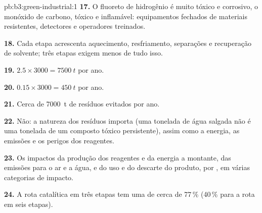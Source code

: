 \begin{solution}{pb:b3:green-industrial:1}
\textbf{17.} O fluoreto de hidrogênio é muito tóxico e corrosivo, o monóxido de carbono, tóxico e
inflamável: equipamentos fechados de materiais resistentes, detectores e operadores
treinados.

\textbf{18.} Cada etapa acrescenta aquecimento, resfriamento, separações e recuperação de solvente; três
etapas exigem menos de tudo isso.

\textbf{19.} $2.5 \times 3000 = \qty{7500}{t}$ por ano.

\textbf{20.} $0.15 \times 3000 = \qty{450}{t}$ por ano.

\textbf{21.} Cerca de \qty{7000}{t} de resíduos evitados por ano.

\textbf{22.} Não: a natureza dos resíduos importa (uma tonelada de água salgada não é uma tonelada de
um composto tóxico persistente), assim como a energia, as emissões e os perigos dos
reagentes.

\textbf{23.} Os impactos da produção dos reagentes e da energia a montante, das emissões para
o ar e a água, e do uso e do descarte do produto, por , em
várias categorias de impacto.

\textbf{24.} A rota catalítica em três etapas tem uma  de cerca de 77\,\% (40\,\% para a
rota em seis etapas).
\end{solution}
